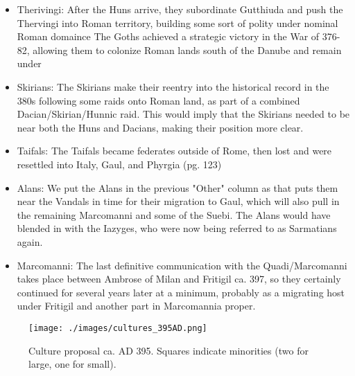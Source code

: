 \documentclass{article}
\begin{document}
\begin{itemize}
		\item Therivingi:\newline
		After the Huns arrive, they subordinate Gutthiuda and push the Thervingi into Roman territory, building some sort of polity under nominal Roman domaince
		The Goths achieved a strategic victory in the War of 376-82, allowing them to colonize Roman lands south of the Danube and remain under \cite{HeatherEmpiresAndBarbarians}\newline
		
		\item Skirians:\newline
		The Skirians make their reentry into the historical record in the 380s following some raids onto Roman land, as part of a combined Dacian/Skirian/Hunnic raid.\newline
		This would imply that the Skirians needed to be near both the Huns and Dacians, making their position more clear.
		
		\item Taifals:\newline
		The Taifals became federates outside of Rome, then lost and were resettled into Italy, Gaul, and Phyrgia \cite{WolframHistoryOfTheGoths} (\tiny pg. 123)\normalsize
		
		\item Alans:\newline
		We put the Alans in the previous "Other" column as that puts them near the Vandals in time for their migration to Gaul, which will also pull in the remaining Marcomanni and some of the Suebi.\newline
		The Alans would have blended in with the Iazyges, who were now being referred to as Sarmatians again.\newline
		
		\item Marcomanni:\newline
		The last definitive communication with the Quadi/Marcomanni takes place between Ambrose of Milan and Fritigil ca. 397, so they certainly continued for several years later at a minimum, probably as a migrating host under Fritigil and another part in Marcomannia proper.
	\end{itemize}
	
	\begin{figure}[h!]
		\centering
		\texttt{[image: ./images/cultures\_395AD.png]}
		\caption{Culture proposal ca. AD 395. Squares indicate minorities (two for large, one for small).}
	\end{figure}
	
\end{document}

